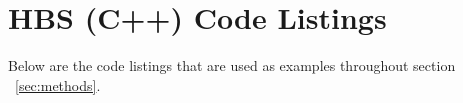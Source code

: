 \section{HBS (C++) Code Listings} \label{app:code}

  Below are the code listings that are used as examples throughout section ~\ref{sec:methods}.

  
  
  \mainstretch{}
